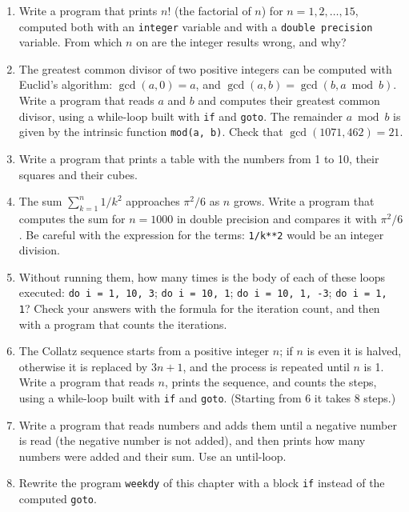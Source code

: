 \begin{enumerate}
    \item Write a program that prints $n!$ (the factorial of $n$) for $n = 1, 2, \ldots, 15$, computed both with an \texttt{integer} variable and with a \texttt{double precision} variable. From which $n$ on are the integer results wrong, and why?
    \item The greatest common divisor of two positive integers can be computed with Euclid's algorithm: $\gcd(a, 0) = a$, and $\gcd(a, b) = \gcd(b, a \bmod b)$. Write a program that reads $a$ and $b$ and computes their greatest common divisor, using a while-loop built with \texttt{if} and \texttt{goto}. The remainder $a \bmod b$ is given by the intrinsic function \texttt{mod(a, b)}. Check that $\gcd(1071, 462) = 21$.
    \item Write a program that prints a table with the numbers from 1 to 10, their squares and their cubes.
    \item The sum $\sum_{k=1}^{n} 1/k^2$ approaches $\pi^2/6$ as $n$ grows. Write a program that computes the sum for $n = 1000$ in double precision and compares it with $\pi^2/6$. Be careful with the expression for the terms: \texttt{1/k**2} would be an integer division.
    \item Without running them, how many times is the body of each of these loops executed: \texttt{do i = 1, 10, 3}; \texttt{do i = 10, 1}; \texttt{do i = 10, 1, -3}; \texttt{do i = 1, 1}? Check your answers with the formula for the iteration count, and then with a program that counts the iterations.
    \item The Collatz sequence starts from a positive integer $n$; if $n$ is even it is halved, otherwise it is replaced by $3n+1$, and the process is repeated until $n$ is 1. Write a program that reads $n$, prints the sequence, and counts the steps, using a while-loop built with \texttt{if} and \texttt{goto}. (Starting from 6 it takes 8 steps.)
    \item Write a program that reads numbers and adds them until a negative number is read (the negative number is not added), and then prints how many numbers were added and their sum. Use an until-loop.
    \item Rewrite the program \texttt{weekdy} of this chapter with a block \texttt{if} instead of the computed \texttt{goto}.
\end{enumerate}
